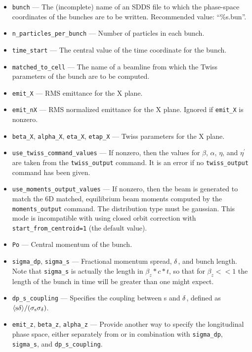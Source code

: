 \documentclass[11pt]{article}
\begin{document}
\begin{itemize}
\item \verb|bunch| --- The (incomplete) name of an SDDS file to which the phase-space coordinates
of the bunches are to be written.  Recommended value: ``\%s.bun''.  
\item \verb|n_particles_per_bunch| --- Number of particles in each bunch.
\item \verb|time_start| --- The central value of the time coordinate for the bunch.
\item \verb|matched_to_cell| --- The name of a beamline from which the Twiss parameters of the bunch
are to be computed.
\item \verb|emit_X| --- RMS emittance for the X plane.
\item \verb|emit_nX| --- RMS normalized emittance for the X plane.  Ignored if \verb|emit_X| is nonzero.
\item \verb|beta_X|, \verb|alpha_X|, \verb|eta_X|, \verb|etap_X| --- Twiss parameters for the X plane.
\item \verb|use_twiss_command_values| --- If nonzero, then the values for $\beta$, $\alpha$, 
        $\eta$, and $\eta^\prime$ are taken from the \verb|twiss_output| command.  It is an error if
        no \verb|twiss_output| command has been given.
\item \verb|use_moments_output_values| --- If nonzero, then the beam is generated to match the
  6D matched, equilibrium beam moments computed by the \verb|moments_output| command.
  The distribution type must be gaussian.
  This mode is incompatible with using closed orbit correction with \verb|start_from_centroid=1|
  (the default value).
\item \verb|Po| --- Central momentum of the bunch.
\item \verb|sigma_dp|, \verb|sigma_s| --- Fractional momentum spread, ${\rm \delta}$, and bunch length.
Note that \verb|sigma_s| is actually the length in $\beta_z*c*t$, so that for $\beta_z<<1$ the length of
the bunch in time will be greater than one might expect.
\item \verb|dp_s_coupling| ---  Specifies the coupling between s and ${\rm \delta}$, defined as 
${\rm \langle s \delta \rangle/(\sigma_s\sigma_\delta)}$.
\item \verb|emit_z|, \verb|beta_z|, \verb|alpha_z| --- Provide another way to specify the
 longitudinal phase space, either separately from or in combination with 
 \verb|sigma_dp|, \verb|sigma_s|, and \verb|dp_s_coupling|.  


\end{itemize}
\end{document}

